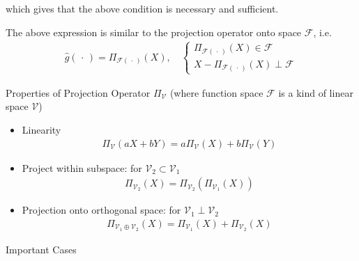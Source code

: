         which gives that the above condition is  necessary and sufficient.
    
    
    
    The above expression is similar to the projection operator onto space $ \mathscr{F} $, i.e.
    \begin{align}
        \hat{g}(\, \cdot \, )=\Pi_{\mathscr{F(\, \cdot \, )}}(X),\quad \begin{cases}
            \Pi_{\mathscr{F(\, \cdot \, )}}(X)\in \mathscr{F}\\
            X-\Pi_{\mathscr{F(\, \cdot \, )}}(X)\perp \mathscr{F}
        \end{cases}
    \end{align}
    
\begin{point}
    Properties of Projection Operator $ \Pi_{\mathcal{V}} $ (where function space $ \mathscr{F} $ is a kind of linear space $ \mathcal{V} $)
\end{point}
\begin{itemize}[topsep=2pt,itemsep=0pt]
    \item Linearity
    \begin{align}
        \Pi_{\mathcal{V}}(aX+bY)=a\Pi_{\mathcal{V}}(X)+b\Pi_{\mathcal{V}}(Y)
    \end{align}
    \item Project within subspace: for $\mathcal{V}_2\subset \mathcal{V}_1 $
    \begin{align}
        \Pi_{\mathcal{V}_2}(X)=\Pi_{\mathcal{V}_2}\left(\Pi_{\mathcal{V}_1}(X)\right) 
    \end{align}
    \item Projection onto orthogonal space: for $ \mathcal{V}_1\perp\mathcal{V}_2 $
    \begin{align}
        \Pi_{\mathcal{V}_1\oplus\mathcal{V}_2}(X)=\Pi_{\mathcal{V}_1}(X)+\Pi_{\mathcal{V}_2}(X) 
    \end{align}
\end{itemize}

\begin{point}
    Important Cases
\end{point}


